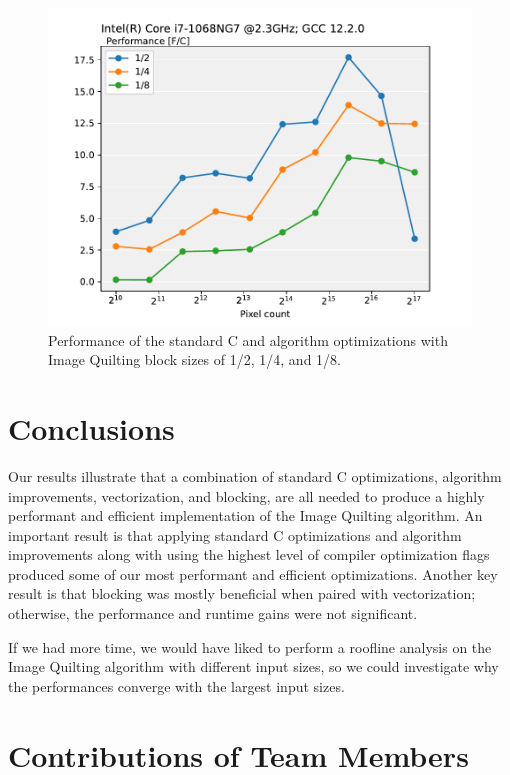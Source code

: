\documentclass[letterpaper]{article}
\begin{document}
\begin{figure}[htb]
  \centering
    \includegraphics[scale=0.5]{248Performances.pdf}
    \caption{Performance of the standard C and algorithm optimizations with Image Quilting block sizes of 1/2, 1/4, and 1/8.
    \label{248Performances}}
  \end{figure}

\section{Conclusions}

Our results illustrate that a combination of standard C optimizations, algorithm improvements, vectorization, and blocking, are all needed to produce a highly performant and efficient implementation of the Image Quilting algorithm. An important result is that applying standard C optimizations and algorithm improvements along with using the highest level of compiler optimization flags produced some of our most performant and efficient optimizations. Another key result is that blocking was mostly beneficial when paired with vectorization; otherwise, the performance and runtime gains were not significant.

If we had more time, we would have liked to perform a roofline analysis on the Image Quilting algorithm with different input sizes, so we could investigate why the performances converge with the largest input sizes.

\section{Contributions of Team Members}
\end{document}
